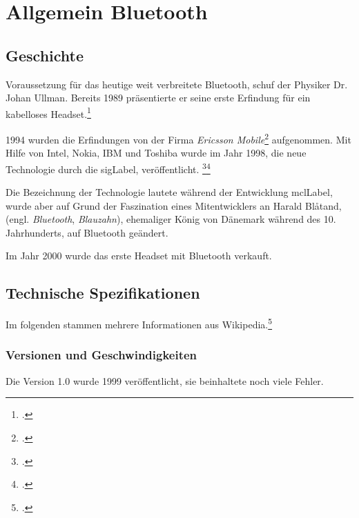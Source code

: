 \chapter{Allgemein Bluetooth}
\label{ch:general}

\section{Geschichte}
Voraussetzung für das heutige weit verbreitete Bluetooth, schuf der Physiker Dr. Johan Ullman.
Bereits 1989 präsentierte er seine erste Erfindung für ein kabelloses Headset.\footcite{Bluetooth_Wikipedia_2015-04-17}

1994 wurden die Erfindungen von der Firma \textit{Ericsson Mobile}\footcite{Ericsson_2015-04-17} aufgenommen.
Mit Hilfe von Intel, Nokia, IBM und Toshiba wurde im Jahr 1998, die neue Technologie durch die \gls{sigLabel}, veröffentlicht.
\footcite{Bluetooth_Special_Interest_Group_Wikipedia_2015-04-17}\footcite{The_history_of_Bluetooth_Ericsson_History_2015-04-17}

Die Bezeichnung der Technologie lautete während der Entwicklung \gls{mclLabel}, wurde aber auf Grund der Faszination eines Mitentwicklers an Harald Bl{\aa}tand, (engl. \textit{Bluetooth}, \textit{Blauzahn}), ehemaliger König von Dänemark während des 10. Jahrhunderts, auf Bluetooth geändert.

Im Jahr 2000 wurde das erste Headset mit Bluetooth verkauft.

\section{Technische Spezifikationen}
\label{sec:general_specs}
Im folgenden  stammen mehrere Informationen aus Wikipedia.\footcite{Bluetooth_Wikipedia_2015-04-17}

\subsection{Versionen und Geschwindigkeiten}
Die Version 1.0 wurde 1999 veröffentlicht, sie beinhaltete noch viele Fehler.

